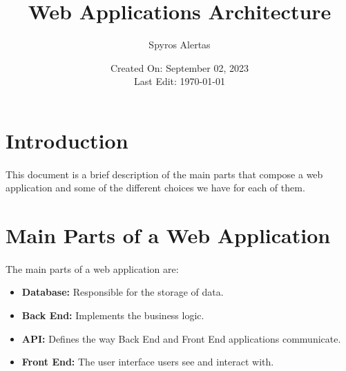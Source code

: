 \documentclass{article}
\title{\bfseries{Web Applications Architecture}}
\author{Spyros Alertas}
\date{Created On: September 02, 2023\\Last Edit: \today}
\begin{document}
\begin{titlingpage}
\maketitle
\end{titlingpage}


\tableofcontents


\newpage
\section{Introduction}
\paragraph{} This document is a brief description of the main parts that compose a web application and some of the different choices we have for each of them.


\section{Main Parts of a Web Application}
\paragraph{} The main parts of a web application are:
\begin{itemize}
	\item \textbf{Database:} Responsible for the storage of data.
	\item \textbf{Back End:} Implements the business logic.
	\item \textbf{API:} Defines the way Back End and Front End applications communicate.
	\item \textbf{Front End:} The user interface users see and interact with.
\end{itemize}
\end{document}
